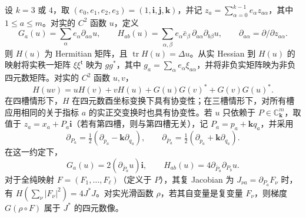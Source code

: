 设 $k=3$ 或 $4$，取 $(e_0,e_1,e_2,e_3)=(1,\mathbf i,\mathbf j,\mathbf k)$，并记 $z_a=\sum_{\alpha=0}^{k-1}e_\alpha z_{a\alpha}$，其中 $1\le a\le m$。对实的 $C^2$ 函数 $u$，定义
\[
G_a(u)=\sum_\alpha e_\alpha\partial_{a\alpha}u,\qquad
H_{ab}(u)=\sum_{\alpha,\beta}e_\alpha\bar e_\beta\,
       \partial_{a\alpha}\partial_{b\beta}u,\qquad
\partial_{a\alpha}=\partial/\partial z_{a\alpha}.
\]
则 $H(u)$ 为 Hermitian 矩阵，且 $\operatorname{tr}H(u)=\Delta u$。从实 Hessian 到 $H(u)$ 的映射将实秩一矩阵 $\xi\xi^{\mathsf t}$ 映为 $gg^*$，其中 $g_a=\sum_\alpha e_\alpha\xi_{a\alpha}$，并将非负实矩阵映为非负四元数矩阵。对实的 $C^2$ 函数 $u,v$，
\[
H(uv)=uH(v)+vH(u)+G(u)G(v)^*+G(v)G(u)^* .
\]
在四槽情形下，$H$ 在四元数酉坐标变换下具有协变性；在三槽情形下，对所有槽应用相同的关于指标 $a$ 的实正交变换时也具有协变性。若 $u$ 只依赖于 $P\in\mathbb C_{\mathbf k}^m$，取值于 $z_a=x_a+P_a\mathbf i$（若有第四槽，则与第四槽无关），记 $P_a=p_a+\mathbf k q_a$，并采用
\[
\partial_{P_a}=\tfrac12(\partial_{p_a}-\mathbf k\partial_{q_a}),\qquad
\partial_{\bar P_a}=\tfrac12(\partial_{p_a}+\mathbf k\partial_{q_a}).
\]
在这一约定下，
\[
G_a(u)=2(\partial_{\bar P_a}u)\mathbf i,\qquad
H_{ab}(u)=4\partial_{\bar P_a}\partial_{P_b}u .
\]
对于全纯映射 $F=(F_1,\ldots,F_\ell)$（定义于 $P$），其复 Jacobian 为 $J_{\nu a}=\partial_{P_a}F_\nu$ 时，有 $H(\sum_\nu|F_\nu|^2)=4J^*J$。对实光滑函数 $\rho$，若其自变量是复变量 $F_\nu$，则梯度 $G(\rho\circ F)$ 属于 $J^*$ 的四元数像。
